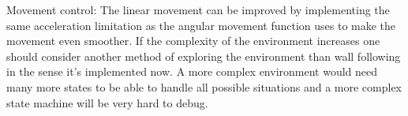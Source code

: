 Movement control: The linear movement can be improved by implementing the same acceleration limitation as the angular movement function uses to make the movement even smoother.
	If the complexity of the environment increases one should consider another method of exploring the environment than wall following in the sense it’s implemented now. A more complex environment would need many more states to be able to handle all possible situations and a more complex state machine will be very hard to debug. 
